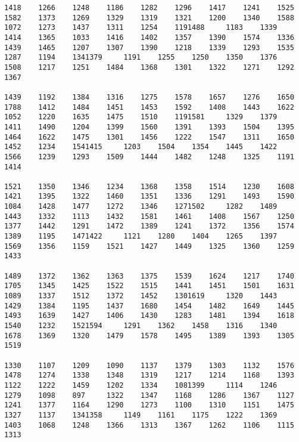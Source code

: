 \begin{verbatim}
1418    1266    1248    1186    1282    1296    1417    1241    1525    1582    1373    1269    1329    1319    1321    1200    1340    1588    1072    1273    1437    1311    1254    1191488     1183    1339    1414    1365    1033    1416    1402    1357    1390    1574    1336    1439    1465    1207    1307    1390    1218    1339    1293    1535    1287    1194    1341379     1191    1255    1250    1350    1376    1508    1217    1251    1484    1368    1301    1322    1271    1292    1367

1439    1192    1384    1316    1275    1578    1657    1276    1650    1788    1412    1484    1451    1453    1592    1408    1443    1622    1052    1220    1635    1475    1510    1191581     1329    1379    1411    1490    1204    1399    1560    1391    1393    1504    1395    1464    1622    1475    1301    1456    1222    1547    1311    1650    1452    1234    1541415     1203    1504    1354    1445    1422    1566    1239    1293    1509    1444    1482    1248    1325    1191    1414

1521    1350    1346    1234    1368    1358    1514    1230    1608    1421    1395    1322    1460    1351    1336    1291    1493    1590    1084    1428    1477    1272    1346    1271502     1282    1489    1443    1332    1113    1432    1581    1461    1408    1567    1250    1377    1442    1291    1472    1389    1241    1372    1356    1574    1389    1195    1471422     1121    1280    1404    1265    1397    1569    1356    1159    1521    1427    1449    1325    1360    1259    1433

1489    1372    1362    1363    1375    1539    1624    1217    1740    1705    1345    1425    1522    1515    1441    1451    1501    1631    1089    1337    1512    1372    1452    1301619     1320    1443    1429    1384    1195    1437    1680    1454    1482    1649    1445    1493    1639    1427    1406    1430    1283    1481    1394    1618    1540    1232    1521594     1291    1362    1458    1316    1340    1678    1369    1320    1479    1578    1495    1389    1393    1305    1519

1330    1107    1209    1090    1137    1379    1303    1132    1576    1478    1274    1338    1348    1319    1217    1214    1168    1393    1122    1222    1459    1202    1334    1081399     1114    1246    1279    1098    897     1322    1347    1168    1286    1367    1127    1241    1377    1164    1290    1273    1100    1310    1151    1475    1327    1137    1341358     1149    1161    1175    1222    1369    1403    1068    1248    1366    1313    1367    1262    1106    1115    1313


\end{verbatim}
